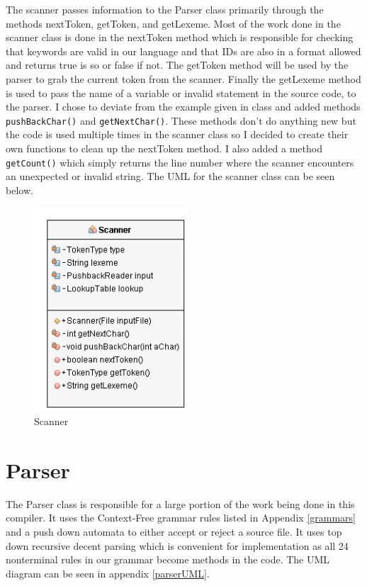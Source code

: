 \documentclass[10]{article}
\begin{document}
The scanner passes information to the Parser class primarily through the methods nextToken, getToken, and getLexeme. Most of the work done in the scanner class is done in the nextToken method which is responsible for checking that keywords are valid in our language and that IDs are also in a format allowed and returns true is so or false if not. The getToken method will be used by the parser to grab the current token from the scanner. Finally the getLexeme method is used to pass the name of a variable or invalid statement in the source code, to the parser. I chose to deviate from the example given in class and added methods \verb|pushBackChar()| and \verb|getNextChar()|. These methods don't do anything new but the code is used multiple times in the scanner class so I decided to create their own functions to clean up the nextToken method. I also added a method \verb|getCount()| which simply returns the line number where the scanner encounters an unexpected or invalid string. The UML for the scanner class can be seen below.

\begin{figure}[!ht]
	\includegraphics[height=3in]{ScannerUML.png}
	\caption{Scanner \label{fig: fg2}}
\end{figure}



\section{Parser}

The Parser class is responsible for a large portion of the work being done in this compiler. It uses the Context-Free grammar rules listed in Appendix \ref{grammars} and a push down automata to either accept or reject a source file. It uses top down recursive decent parsing which is convenient for implementation as all 24 nonterminal rules in our grammar become methods in the code. The UML diagram can be seen in appendix \ref{parserUML}. 
\end{document}
